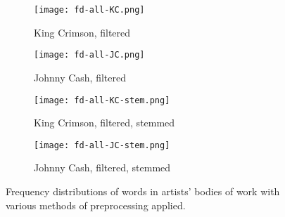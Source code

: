 \begin{figure*}[p]
	\centering
	\begin{subfigure}{0.5\linewidth}
		\centering
		\texttt{[image: fd-all-KC.png]}
		\caption{King Crimson, filtered}
		\label{fig:freq dist KC}
	\end{subfigure}%
	\begin{subfigure}{0.5\linewidth}
		\centering
		\texttt{[image: fd-all-JC.png]}
		\caption{Johnny Cash, filtered}
		\label{fig:freq dist JC}
	\end{subfigure}
	
	\begin{subfigure}{0.5\linewidth}
		\centering
		\texttt{[image: fd-all-KC-stem.png]}
		\caption{King Crimson, filtered, stemmed}
		\label{fig:freq dist KC stem}
	\end{subfigure}%
	\begin{subfigure}{0.5\linewidth}
		\centering
		\texttt{[image: fd-all-JC-stem.png]}
		\caption{Johnny Cash, filtered, stemmed}
		\label{fig:freq dist JC stem}
	\end{subfigure}
	\caption{Frequency distributions of words in artists' bodies of work with various methods of preprocessing applied.}
\end{figure*}